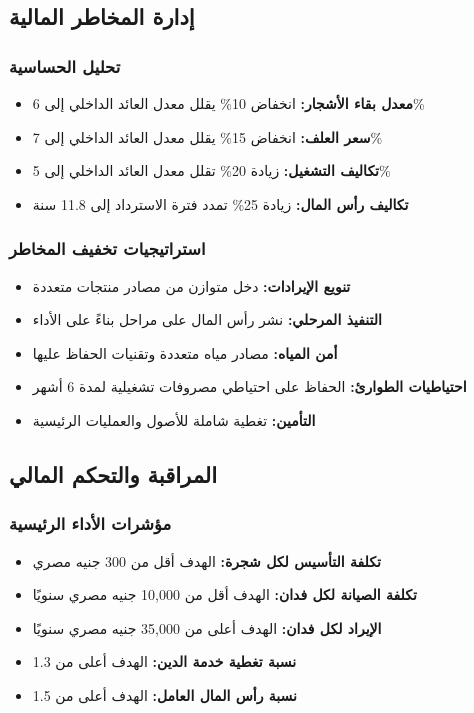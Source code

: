 \subsection{إدارة المخاطر المالية}

\subsubsection{تحليل الحساسية}
\begin{itemize}
    \item \textbf{معدل بقاء الأشجار:} انخفاض 10\% يقلل معدل العائد الداخلي إلى 6\%
    \item \textbf{سعر العلف:} انخفاض 15\% يقلل معدل العائد الداخلي إلى 7\%
    \item \textbf{تكاليف التشغيل:} زيادة 20\% تقلل معدل العائد الداخلي إلى 5\%
    \item \textbf{تكاليف رأس المال:} زيادة 25\% تمدد فترة الاسترداد إلى 11.8 سنة
\end{itemize}

\subsubsection{استراتيجيات تخفيف المخاطر}
\begin{itemize}
    \item \textbf{تنويع الإيرادات:} دخل متوازن من مصادر منتجات متعددة
    \item \textbf{التنفيذ المرحلي:} نشر رأس المال على مراحل بناءً على الأداء
    \item \textbf{أمن المياه:} مصادر مياه متعددة وتقنيات الحفاظ عليها
    \item \textbf{احتياطيات الطوارئ:} الحفاظ على احتياطي مصروفات تشغيلية لمدة 6 أشهر
    \item \textbf{التأمين:} تغطية شاملة للأصول والعمليات الرئيسية
\end{itemize}

\subsection{المراقبة والتحكم المالي}

\subsubsection{مؤشرات الأداء الرئيسية}
\begin{itemize}
    \item \textbf{تكلفة التأسيس لكل شجرة:} الهدف أقل من 300 جنيه مصري
    \item \textbf{تكلفة الصيانة لكل فدان:} الهدف أقل من 10,000 جنيه مصري سنويًا
    \item \textbf{الإيراد لكل فدان:} الهدف أعلى من 35,000 جنيه مصري سنويًا
    \item \textbf{نسبة تغطية خدمة الدين:} الهدف أعلى من 1.3
    \item \textbf{نسبة رأس المال العامل:} الهدف أعلى من 1.5
\end{itemize}

